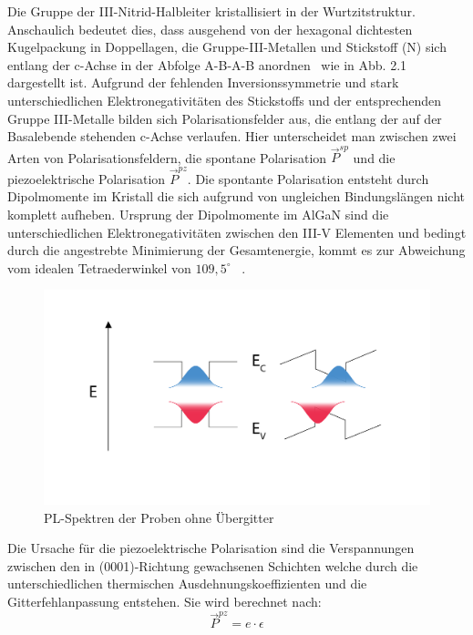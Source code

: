 Die Gruppe der III-Nitrid-Halbleiter kristallisiert in der Wurtzitstruktur. Anschaulich bedeutet dies, dass ausgehend von der hexagonal dichtesten Kugelpackung in Doppellagen, die Gruppe-III-Metallen und Stickstoff (N) sich entlang der c-Achse in der Abfolge A-B-A-B anordnen~\cite{buchc} wie in Abb. 2.1 dargestellt ist. 
\newline
Aufgrund der fehlenden Inversionssymmetrie und stark unterschiedlichen Elektronegativitäten des Stickstoffs und der entsprechenden Gruppe III-Metalle bilden sich Polarisationsfelder aus, die entlang der auf der Basalebende stehenden c-Achse verlaufen. Hier unterscheidet man zwischen zwei Arten von Polarisationsfeldern, die spontane Polarisation $ \vec{P}^{sp} $ und die piezoelektrische Polarisation $ \vec{P}^{pz} $.
\newline\newline
Die spontante Polarisation entsteht durch Dipolmomente im Kristall die sich aufgrund von ungleichen Bindungslängen nicht komplett aufheben. Ursprung der 
Dipolmomente im AlGaN sind die unterschiedlichen Elektronegativitäten zwischen den III-V Elementen und bedingt durch die angestrebte Minimierung der Gesamtenergie, kommt es zur Abweichung vom idealen Tetraederwinkel von $109,5^{\circ}$ ~\cite{ambacher2002}.
%
\begin{figure}[htb]
    \centering
    \begin{minipage}[t]{0.49\linewidth}
        \centering
        \includegraphics[width=\linewidth]{Bilder/QCSE.pdf}
        \caption{PL-Spektren der Proben ohne Übergitter}
    \end{minipage}%
\end{figure}
\vspace{1cm}
\raggedright
%
Die Ursache für die piezoelektrische Polarisation sind die Verspannungen zwischen den in (0001)-Richtung gewachsenen Schichten welche durch die unterschiedlichen thermischen Ausdehnungskoeffizienten und die Gitterfehlanpassung entstehen. Sie wird berechnet nach: 
%
\begin{equation}
    \vec{P}^{pz} = e \cdot \epsilon
\end{equation}
%
